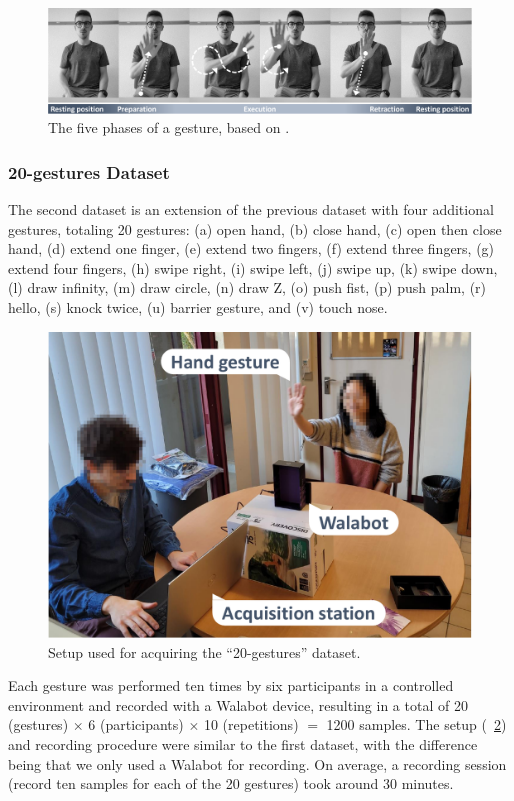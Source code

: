 \begin{figure}[bt]
    \centering
    \includegraphics[width=\linewidth]{Figures/RadarExperiments/Datasets/20Gestures/gesture_stages.pdf}
    \caption{The five phases of a gesture, based on \cite{Kendon:1980}.}
    \label{fig:radar-experiments:gestures-stages}
\end{figure}


\subsubsection{20-gestures Dataset} \label{sec:radar-experiments:data-collection:datasets:20-gestures}
The second dataset is an extension of the previous dataset with four additional gestures, totaling 20 gestures: (a) open hand, (b) close hand, (c) open then close hand, (d) extend one finger, (e) extend two fingers, (f) extend three fingers, (g) extend four fingers, (h) swipe right, (i) swipe left, (j) swipe up, (k) swipe down, (l) draw infinity, (m) draw circle, (n) draw Z, (o) push fist, (p) push palm, (r) hello, (s) knock twice, (u) barrier gesture, and (v) touch nose.

\begin{figure}[hbt]
    \centering
    \includegraphics[width=.6\linewidth]{Figures/RadarExperiments/Datasets/20Gestures/setup-walabot-only.pdf}
    \caption{Setup used for acquiring the ``20-gestures'' dataset.}
    \label{fig:radar-experiments:setup:walabot-only}
\end{figure}

Each gesture was performed ten times by six participants in a controlled environment and recorded with a Walabot device, resulting in a total of 20 (gestures) $\times$ 6 (participants) $\times$ 10 (repetitions) ${=}$ 1200 samples. 
%
The setup (\fig~\ref{fig:radar-experiments:setup:walabot-only}) and recording procedure were similar to the first dataset, with the difference being that we only used a Walabot for recording.
On average, a recording session (\ie record ten samples for each of the 20 gestures) took around 30 minutes. 

